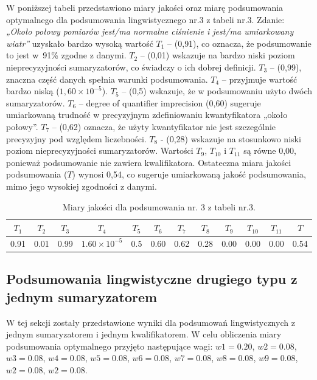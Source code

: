 \documentclass{article}
\begin{document}
W poniższej tabeli przedstawiono miary jakości oraz miarę podsumowania optymalnego dla podsumowania lingwistycznego nr.3 z tabeli nr.3. Zdanie: \textit{„Około połowy pomiarów jest/ma normalne ciśnienie i jest/ma umiarkowany wiatr”} uzyskało bardzo wysoką wartość \(T_1\) – (0{,}91), co oznacza, że podsumowanie to jest w~91\% zgodne z danymi. \(T_2\) – (0{,}01) wskazuje na bardzo niski poziom nieprecyzyjności sumaryzatorów, co świadczy o ich dobrej definicji. \(T_3\) – (0{,}99), znaczna część danych spełnia warunki podsumowania. \(T_4\) – przyjmuje wartość bardzo niską (\(1{,}60 \times 10^{-5}\)). \(T_5\) –  (0{,}5) wskazuje, że w podsumowaniu użyto dwóch sumaryzatorów. \(T_6\) – degree of quantifier imprecision (0{,}60) sugeruje umiarkowaną trudność w precyzyjnym zdefiniowaniu kwantyfikatora „około połowy”. \(T_7\) – (0{,}62) oznacza, że użyty kwantyfikator nie jest szczególnie precyzyjny pod względem liczebności. \(T_8\) - (0{,}28) wskazuje na stosunkowo niski poziom nieprecyzyjności sumaryzatorów. Wartości \(T_9\), \(T_{10}\) i \(T_{11}\) są równe 0{,}00, ponieważ podsumowanie nie zawiera kwalifikatora. Ostateczna miara jakości podsumowania (\(T\)) wynosi 0{,}54, co sugeruje umiarkowaną jakość podsumowania, mimo jego wysokiej zgodności z danymi.


\begin{table}[H]
    \centering
    \begin{tabular}{|c|c|c|c|c|c|c|c|c|c|c|c|}
    \hline
    \textbf{\(T_1\)} &\textbf{\(T_2\)} & \textbf{\(T_3\)} & \textbf{\(T_4\)} & \textbf{\(T_5\)} & \textbf{\(T_6\)} & \textbf{\(T_7\)} & \textbf{\(T_8\)} & \textbf{\(T_9\)} & \textbf{\(T_{10}\)} & \textbf{\(T_{11}\)} & \textbf{\(T\)} \\ \hline
    0.91 & 0.01 & 0.99 & \(1.60 \times 10^{-5}\) & 0.5 & 0.60 & 0.62 & 0.28 & 0.00 & 0.00 & 0.00 & 0.54 \\ \hline
    \end{tabular}
    \caption{Miary jakości dla podsumowania nr. 3 z tabeli nr.3.}
\end{table}  


\subsection{Podsumowania lingwistyczne drugiego typu z jednym sumaryzatorem}
W tej sekcji zostały przedstawione wyniki dla podsumowań lingwistycznych z jednym sumaryzatorem i jednym kwalifikatorem.
W celu obliczenia miary podsumowania optymalnego przyjęto następujące wagi: \(w1 = 0.20\), \(w2 = 0.08\), \(w3 = 0.08\), \(w4 = 0.08\), \(w5 = 0.08\), \(w6 = 0.08\), \(w7 = 0.08\), \(w8 = 0.08\), \(w9 = 0.08\), \(w2 = 0.08\), \(w2 = 0.08\).
\end{document}
